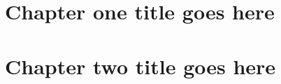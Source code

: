 \documentclass[a4paper,11pt,phdthesis,oneside,oneandhalfspace,pdflatex]{cssethesis} %
\begin{document}

\frontmatter					%
\thesistitlepage				%
\thesiscopyrightpage			%
\thesisdeclarationpage			%

\tableofcontents				%
\listoftables					%
\listoffigures					%

%

\mainmatter	%

\chapter{Chapter one title goes here}\label{chap:chapter1}


\chapter{Chapter two title goes here}\label{chap:chapter2}



\end{document}
